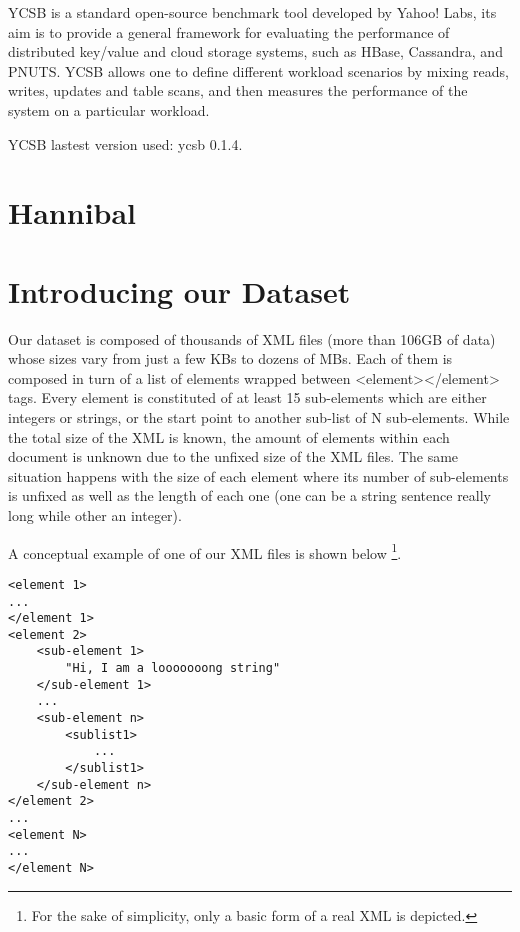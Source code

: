 YCSB\cite{cooper2010benchmarking} is a standard open-source benchmark tool developed by Yahoo! Labs, its aim is to provide a general framework for evaluating the performance of distributed key/value and cloud storage systems, such as HBase, Cassandra, and PNUTS. YCSB allows one to define different workload scenarios by mixing reads, writes, updates and table scans, and then measures the performance of the system on a particular workload.
\par
{}
\par
YCSB lastest version \cite{YCSB} used: ycsb 0.1.4.

\section{Hannibal}




\section{Introducing our Dataset}

Our dataset is composed of thousands of XML files (more than 106GB of data) whose sizes vary from just a few KBs to dozens of MBs. Each of them is composed in turn of a list of elements wrapped between <element></element> tags. Every element is constituted of at least 15 sub-elements which are either integers or strings, or the start point to another sub-list of N sub-elements. While the total size of the XML is known, the amount of elements within each document is unknown due to the unfixed size of the XML files. The same situation happens with the size of each element where its number of sub-elements is unfixed as well as the length of each one (one can be a string sentence really long while other an integer). 
\par
A conceptual example of one of our XML files is shown below \footnote{For the sake of simplicity, only a basic form of a real XML is depicted.}.

\lstset{language=XML, basicstyle=\footnotesize, numbers=left, breaklines=true}
\begin{lstlisting}
<element 1>
...
</element 1>
<element 2>
	<sub-element 1>
		"Hi, I am a looooooong string"
	</sub-element 1>
	...
	<sub-element n>
		<sublist1>
			...
		</sublist1>
	</sub-element n>
</element 2>
...
<element N>
...
</element N>
\end{lstlisting}

